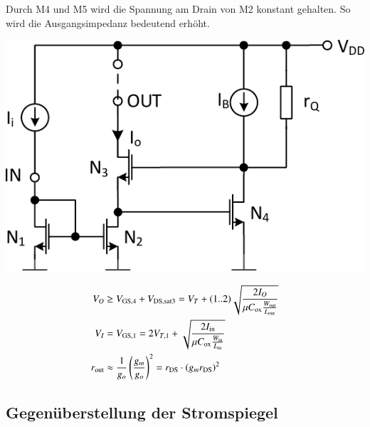 Durch M4 und M5 wird die Spannung am Drain von M2 konstant gehalten. 
So wird die Ausgangsimpedanz bedeutend erhöht.


\begin{minipage}[t]{0.42\columnwidth}
    \includegraphics[width=\columnwidth, align=t]{images/06_stormspiegel_geregelte_kaskode.pdf}

\end{minipage}
\hfill
\begin{minipage}[t]{0.56\columnwidth}

    \vspace{-0.4cm}

    \begin{align*}
        V_O         &\geq V_{\rm GS,4} + V_{\rm DS,sat3} = V_T + (1..2) \sqrt{ \frac{2 I_O}{\mu C_{\rm ox} \frac{W_{\rm out}}{L_{\rm out}}} }                                                                                           \\
        V_I         &= V_{\rm GS,1} = 2 V_{T,1} + \sqrt{ \frac{2 I_{\rm in}}{\mu C_{\rm ox} \frac{W_{\rm in}}{L_{\rm in}}} }                                                                                                                                     \\
        r_{\rm out} &\approx \frac{1}{g_o} \left( \frac{g_m}{g_o} \right)^2 = r_{\rm DS} \cdot (g_m r_{\rm DS})^2
    \end{align*}
\end{minipage}


\subsection{Gegenüberstellung der Stromspiegel}

